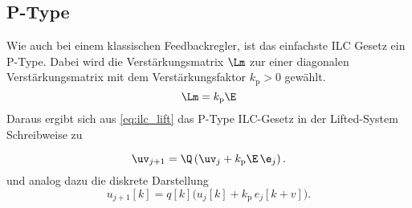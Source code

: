 \subsection{P-Type}
Wie auch bei einem klassischen Feedbackregler, ist das einfachste ILC Gesetz ein P-Type. Dabei wird die Verstärkungsmatrix $\Lm$ zur einer diagonalen Verstärkungsmatrix mit dem Verstärkungsfaktor $k_\mathrm{p} > 0$ gewählt.
\begin{equation}
	\label{eq:L_p}
	\Lm = k_\mathrm{p} \E
\end{equation}
Daraus ergibt sich aus \autoref{eq:ilc_lift} das P-Type ILC-Gesetz in der Lifted-System Schreibweise zu

\begin{equation}
	\label{eq:ilc_p}
	\uv_{j+1} = \Q \left( \uv_j + k_\mathrm{p}  \E \, \e_j \right).
\end{equation}
und analog dazu die diskrete Darstellung
\begin{equation}
	\label{eq:ilc_p_k}
	u_{j+1}[k] = q[k] \bigl(u_j[k] + k_\mathrm{p} \, e_j[k+v] \bigr).
\end{equation}

